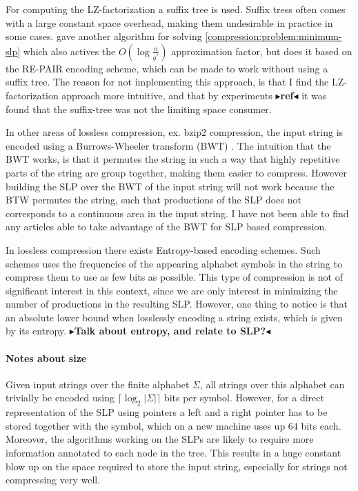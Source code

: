 \documentclass[twoside,11pt,openright]{report}
\newcommand{\todo}[1]{{\color[rgb]{.5,0,0}\textbf{$\blacktriangleright$#1$\blacktriangleleft$}}}
\newcommand{\ceil}[1] {\lceil #1 \rceil}
\begin{document}
For computing the LZ-factorization a suffix tree is used. Suffix tress often comes with a large constant space overhead, making them undesirable in practice in some cases. \cite{Sakamoto2005416} gave another algorithm for solving \cref{compression:problem:minimum-slp} which also actives the $O(\log{\frac{n}{g^*}})$ approximation factor, but does it based on the RE-PAIR encoding scheme, which can be made to work without using a suffix tree. The reason for not implementing this approach, is that I find the LZ-factorization approach more intuitive, and that by experiments \todo{ref} it was found that the suffix-tree was not the limiting space consumer.

In other areas of lossless compression, ex. bzip2 compression, the input string is encoded using a Burrows-Wheeler transform (BWT) \cite{BurrowsWheeler}. The intuition that the BWT works, is that it permutes the string in such a way that highly repetitive parts of the string are group together, making them easier to compress. However building the SLP over the BWT of the input string will not work because the BTW permutes the string, such that productions of the SLP does not corresponds to a continuous area in the input string. I have not been able to find any articles able to take advantage of the BWT for SLP based compression.

In lossless compression there exists Entropy-based encoding schemes. Such schemes uses the frequencies of the appearing alphabet symbols in the string to compress them to use as few bits as possible. This type of compression is not of significant interest in this context, since we are only interest in minimizing the number of productions in the resulting SLP. However, one thing to notice is that an absolute lower bound when losslessly encoding a string exists, which is given by its entropy.
\todo{Talk about entropy, and relate to SLP?}

\paragraph{Notes about size}
Given input strings over the finite alphabet $\Sigma$, all strings over this alphabet can trivially be encoded using $\ceil{\log_2 |\Sigma|}$ bits per symbol. However, for a direct representation of the SLP using pointers a left and a right pointer has to be stored together with the symbol, which on a new machine uses up $64$ bits each. Moreover, the algorithms working on the SLPs are likely to require more information annotated to each node in the tree. This results in a huge constant blow up on the space required to store the input string, especially for strings not compressing very well.
\end{document}
